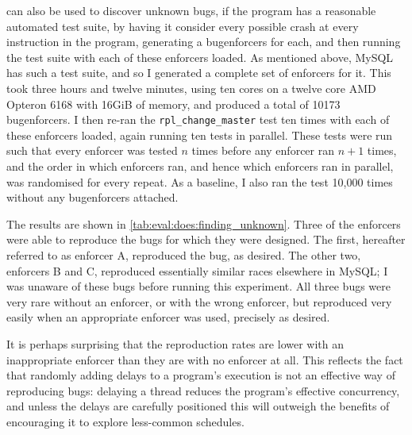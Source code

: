 {\Technique} can also be used to discover unknown bugs, if the program
has a reasonable automated test suite, by having it consider every
possible crash at every instruction in the program, generating a
\glspl{bugenforcer} for each, and then running the test suite with
each of these enforcers loaded.  As mentioned above, MySQL has such a
test suite, and so I generated a complete set of enforcers for it.
This took three hours and twelve minutes, using
ten cores on a twelve core AMD Opteron 6168 with 16GiB of memory, and
produced a total of 10173 \glspl{bugenforcer}.  I then re-ran the
\texttt{rpl\_change\_master} test ten times with each of these
enforcers loaded, again running ten tests in parallel.  These tests
were run such that every enforcer was tested $n$ times before any
enforcer ran $n+1$ times, and the order in which enforcers ran, and
hence which enforcers ran in parallel, was randomised for every
repeat.  As a baseline, I also ran the test 10,000 times without any
\glspl{bugenforcer} attached.

The results are shown in \autoref{tab:eval:does:finding_unknown}.
Three of the enforcers were able to reproduce the bugs for which they
were designed.  The first, hereafter referred to as enforcer A,
reproduced the  bug, as desired.  The other two,
enforcers B and C, reproduced essentially similar races elsewhere in
MySQL; I was unaware of these bugs before running this experiment.
All three bugs were very rare without an enforcer, or with the wrong
enforcer, but reproduced very easily when an appropriate enforcer was
used, precisely as desired.

It is perhaps surprising that the reproduction rates are lower with an
inappropriate enforcer than they are with no enforcer at all.  This
reflects the fact that randomly adding delays to a program's execution
is not an effective way of reproducing bugs: delaying a thread reduces
the program's effective concurrency, and unless the delays are
carefully positioned this will outweigh the benefits of encouraging it
to explore less-common schedules.

